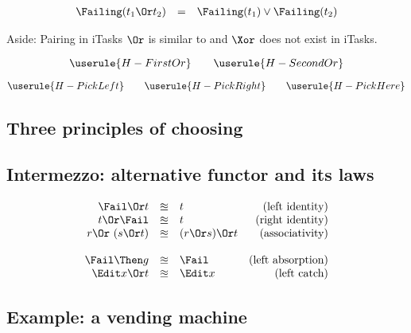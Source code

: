 \begin{equation*}
  \begin{array}{lcl}
    \Failing(t_1 \Or t_2) &=& \Failing(t_1) \lor \Failing(t_2)
  \end{array}
\end{equation*}

\begin{margintext}{Aside: Pairing in iTasks}
  $\Or$ is similar to \type{-||-}
  and $\Xor$ does not exist in iTasks.
\end{margintext}

\begin{equation*}
  \userule{H-FirstOr} \qquad \userule{H-SecondOr}
\end{equation*}

\begin{equation*}
  \userule{H-PickLeft} \qquad \userule{H-PickRight} \qquad \userule{H-PickHere}
\end{equation*}


\subsection{Three principles of choosing}


\subsection{Intermezzo: alternative functor and its laws}

\begin{equation*}
  \begin{array}{rclr}
    \Fail \Or t
      &\approxeq& t
      & \text{(left identity)} \\
    t \Or \Fail
      &\approxeq& t
      & \text{(right identity)} \\
    r \Or\ (s \Or t)
      &\approxeq& (r \Or s) \Or t
      & \text{(associativity)} \\
    & & & \\
    \Fail \Then g
      &\approxeq& \Fail
      & \text{(left absorption)} \\
    \Edit x \Or t
      &\approxeq& \Edit x
      & \text{(left catch)}
  \end{array}
\end{equation*}



\subsection{Example: a vending machine}

